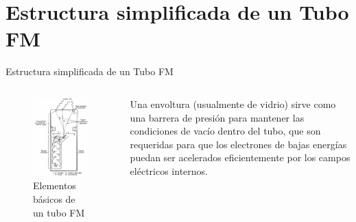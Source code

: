 \documentclass[a4paper,10pt]{beamer}
\begin{document}
\section{Estructura simplificada de un Tubo FM}
\begin{frame}[allowframebreaks]{Estructura simplificada de un Tubo FM}
 
 \begin{columns}[c]
  \column{1.5in}
  \begin{figure}
  \center
   \includegraphics[scale=0.28]{fig2}
   \caption{Elementos básicos de un tubo FM}
  \end{figure}

  \column{2.5in}
  \begin{justify}
   
   \footnotesize{Una envoltura (usualmente de vidrio) sirve como una barrera de presión
   para mantener las condiciones de vacío dentro del tubo, que son requeridas
   para que los electrones de bajas energías puedan ser acelerados eficientemente
   por los campos eléctricos internos.
   
   \vspace{.3cm}
   
}
\end{justify}
\end{columns}
\end{frame}
\end{document}
